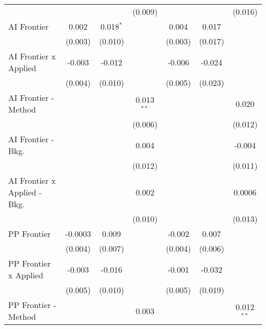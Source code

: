 \begin{tabular}{lcccccc}
                                  &                &              & (0.009)       &                &               & (0.016)\\   
   AI Frontier                    & 0.002          & 0.018$^{*}$  &               & 0.004          & 0.017         &   \\   
                                  & (0.003)        & (0.010)      &               & (0.003)        & (0.017)       &   \\   
   AI Frontier x Applied          & -0.003         & -0.012       &               & -0.006         & -0.024        &   \\   
                                  & (0.004)        & (0.010)      &               & (0.005)        & (0.023)       &   \\   
   AI Frontier - Method           &                &              & 0.013$^{**}$  &                &               & 0.020\\   
                                  &                &              & (0.006)       &                &               & (0.012)\\   
   AI Frontier - Bkg.             &                &              & 0.004         &                &               & -0.004\\   
                                  &                &              & (0.012)       &                &               & (0.011)\\   
   AI Frontier x Applied - Bkg.   &                &              & 0.002         &                &               & 0.0006\\   
                                  &                &              & (0.010)       &                &               & (0.013)\\   
   PP Frontier                    & -0.0003        & 0.009        &               & -0.002         & 0.007         &   \\   
                                  & (0.004)        & (0.007)      &               & (0.004)        & (0.006)       &   \\   
   PP Frontier x Applied          & -0.003         & -0.016       &               & -0.001         & -0.032        &   \\   
                                  & (0.005)        & (0.010)      &               & (0.005)        & (0.019)       &   \\   
   PP Frontier - Method           &                &              & 0.003         &                &               & 0.012$^{**}$\\   

\end{tabular}
